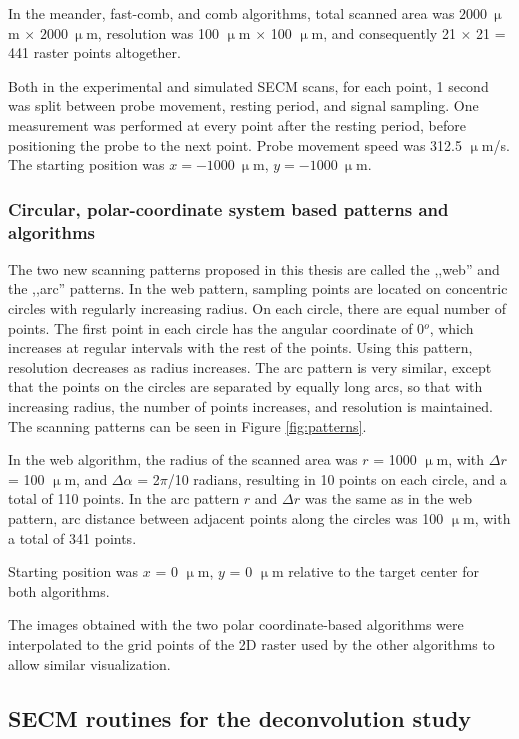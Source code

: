 In the meander, fast-comb, and comb algorithms, total scanned area was $2000~\upmu$m $\times$ $2000~\upmu$m, resolution was 100 $\upmu$m $\times$ 100 $\upmu$m, and consequently 21 $\times$ 21 = 441 raster points altogether. 
 
Both in the experimental and simulated SECM scans, for each point, 1 second was split between probe movement, resting period, and signal sampling.
One measurement was performed at every point after the resting period, before positioning the probe to the next point.
Probe movement speed was 312.5 $\upmu$m/s.
The starting position was $x = -1000~\upmu$m, $y = -1000~\upmu$m.

			\subsubsection{Circular, polar-coordinate system based patterns and algorithms}
The two new scanning patterns proposed in this thesis are called the ,,web'' and the ,,arc'' patterns.
In the web pattern, sampling points are located on concentric circles with regularly increasing radius.
On each circle, there are equal number of points.
The first point in each circle has the angular coordinate of 0$^{o}$, which increases at regular intervals with the rest of the points.
Using this pattern, resolution decreases as radius increases.
The arc pattern is very similar, except that the points on the circles are separated by equally long arcs, so that with increasing radius, the number of points increases, and resolution is maintained.
The scanning patterns can be seen in Figure \ref{fig:patterns}.

In the web algorithm, the radius of the scanned area was $r$ = 1000 $\upmu$m, with $\Delta r$ = 100 $\upmu$m, and $\Delta \alpha$ = 2$\pi$/10 radians, resulting in 10 points on each circle, and a total of 110 points.
In the arc pattern $r$ and $\Delta r$ was the same as in the web pattern, arc distance between adjacent points along the circles was 100 $\upmu$m, with a total of 341 points.

Starting position was $x$ = 0 $\upmu$m, $y$ = 0 $\upmu$m relative to the target center for both algorithms.

The images obtained with the two polar coordinate-based algorithms were interpolated to the grid points of the 2D raster used by the other algorithms to allow similar visualization.

	\subsection{SECM routines for the deconvolution study}
